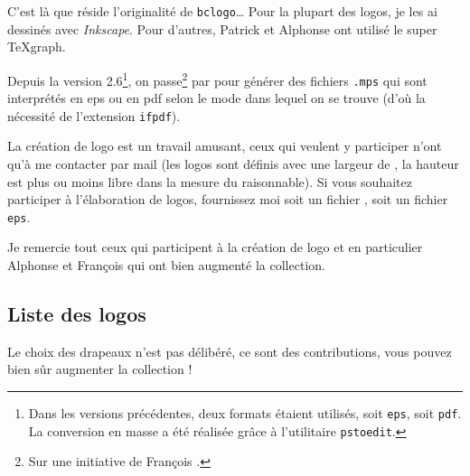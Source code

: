 \documentclass[a4paper,10pt,frenchb]{article}
\begin{document}
C'est là que réside l'originalité de \texttt{bclogo}\dots{}  Pour la
plupart des logos, je les ai dessinés avec \textit{Inkscape}.
Pour d'autres, Patrick  et Alphonse  ont
utilisé le
super \TeX{}graph.

Depuis la version 2.6\footnote{Dans les versions précédentes, deux
  formats étaient utilisés, soit \texttt{eps}, soit
  \texttt{pdf}. La conversion en masse a été réalisée grâce à
  l'utilitaire \texttt{pstoedit}.}, on passe\footnote{Sur une
  initiative de
  François .} par \MP{} pour générer des fichiers
\texttt{.mps} qui sont interprétés en eps ou en pdf selon le mode dans
lequel on se trouve (d'où la nécessité de l'extension \verb+ifpdf+).

La création de logo est un travail amusant, ceux qui veulent y
participer n'ont
qu'à me contacter par mail (les logos sont définis avec une largeur de
, la
hauteur est plus ou moins libre dans la mesure du raisonnable).
Si vous souhaitez participer à l'élaboration de logos,  fournissez moi
soit un fichier \MP{}, soit un fichier
\texttt{eps}.

Je remercie tout ceux qui participent à la création de logo et en particulier
Alphonse  et François  qui ont bien
augmenté la collection.

\subsection{Liste des logos}

Le choix des drapeaux n'est pas délibéré, ce sont des contributions,
vous pouvez bien sûr augmenter la collection !
\end{document}
